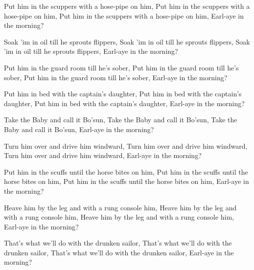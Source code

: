 \beginverse
Put him in the scuppers with a hose-pipe on him,
Put him in the scuppers with a hose-pipe on him,
Put him in the scuppers with a hose-pipe on him,
Earl-aye in the morning?
\endverse

\beginverse
Soak 'im in oil till he sprouts flippers,
Soak 'im in oil till he sprouts flippers,
Soak 'im in oil till he sprouts flippers,
Earl-aye in the morning?
\endverse

\beginverse
Put him in the guard room till he's sober,
Put him in the guard room till he's sober,
Put him in the guard room till he's sober,
Earl-aye in the morning?
\endverse

\beginverse
Put him in bed with the captain's daughter,
Put him in bed with the captain's daughter,
Put him in bed with the captain's daughter,
Earl-aye in the morning?
\endverse

\beginverse
Take the Baby and call it Bo'sun,
Take the Baby and call it Bo'sun,
Take the Baby and call it Bo'sun,
Earl-aye in the morning?
\endverse

\beginverse
Turn him over and drive him windward,
Turn him over and drive him windward,
Turn him over and drive him windward,
Earl-aye in the morning?
\endverse

\beginverse
Put him in the scuffs until the horse bites on him,
Put him in the scuffs until the horse bites on him,
Put him in the scuffs until the horse bites on him,
Earl-aye in the morning?
\endverse

\beginverse
Heave him by the leg and with a rung console him,
Heave him by the leg and with a rung console him,
Heave him by the leg and with a rung console him,
Earl-aye in the morning?
\endverse

\beginverse
That's what we'll do with the drunken sailor,
That's what we'll do with the drunken sailor,
That's what we'll do with the drunken sailor,
Earl-aye in the morning?
\endverse
\endsong
